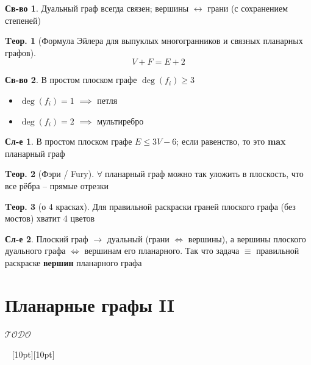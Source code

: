 \documentclass[a4paper,12pt]{article}
\theoremstyle{definition}
\newtheorem*{property}{Св-во}  %
\theoremstyle{definition}
\newtheorem{theorem}{Tеор.}[section]
\newtheorem*{corollary}{Сл-е} %
\def\iiany{$\forall\;$}
\def\iiTODO{\guillemotleft$\mathcal{TODO}$\guillemotright\textellipsis}
\begin{document}
\begin{property}
	Дуальный граф всегда связен; вершины $\longleftrightarrow$ грани (с сохранением степеней)
\end{property}

\begin{theorem}[Формула Эйлера для выпуклых многогранников и связных планарных графов]
	\[ V+F = E+2 \]
\end{theorem}

\begin{property}
	В простом плоском графе $\deg(f_i) \geqslant 3$
	\begin{itemize}
		\item $\deg(f_i)=1$ $\implies$ петля
		\item $\deg(f_i)=2$ $\implies$ мультиребро
	\end{itemize}
\end{property}

\begin{corollary}
	В простом плоском графе $E \leqslant 3V-6$; если равенство, то это \textbf{max} планарный граф
\end{corollary}

\begin{theorem}[Фэри / Fury]
	\iiany планарный граф можно так уложить в плоскость, что все рёбра -- прямые отрезки 
\end{theorem}

\begin{theorem}[о 4 красках]
	Для правильной раскраски граней плоского графа (без мостов) хватит 4 цветов
\end{theorem}

\begin{corollary}
	Плоский граф $\longrightarrow$ дуальный (грани $\Leftrightarrow$ вершины), а вершины плоского дуального графа $\Leftrightarrow$ вершинам его планарного. Так что задача $\equiv$ правильной раскраске \textbf{вершин} планарного графа
\end{corollary}



\section{Планарные графы II}

\iiTODO



\vspace{48pt} \noindent \hrulefill~ \raisebox{-8pt}[10pt][10pt]{\Huge{}}~ \hrulefill
\end{document}
